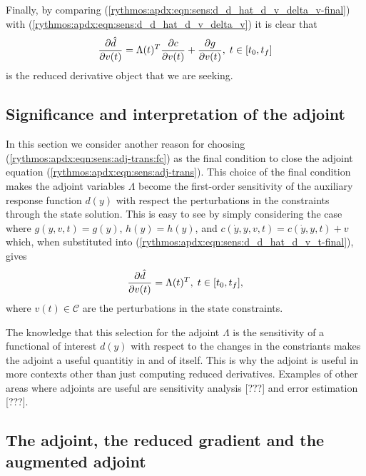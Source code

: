 \documentclass[pdf,ps2pdf,11pt]{SANDreport}
\begin{document}
Finally, by comparing (\ref{rythmos:apdx:eqn:sens:d_d_hat_d_v_delta_v-final})
with (\ref{rythmos:apdx:eqn:sens:d_d_hat_d_v_delta_v}) it is clear that
%
\begin{equation}
\displaystyle{\frac{\partial \hat{d}}{\partial v(t)}} = \Lambda(t)^T \displaystyle{\frac{\partial c}{\partial v(t)}} + \displaystyle{\frac{\partial g}{\partial v(t)}}, \; t\in[t_0,t_f]
\label{rythmos:apdx:eqn:sens:d_d_hat_d_v_t-final}
\end{equation}
%
is the reduced derivative object that we are seeking.

\subsection{Significance and interpretation of the adjoint}

In this section we consider another reason for choosing
(\ref{rythmos:apdx:eqn:sens:adj-trans:fc}) as the final condition to close the
adjoint equation (\ref{rythmos:apdx:eqn:sens:adj-trans}).  This choice of the
final condition makes the adjoint variables $\Lambda$ become the first-order
sensitivity of the auxiliary response function $d(y)$ with respect the
perturbations in the constraints through the state solution.  This is easy to
see by simply considering the case where $g(y,v,t) = g(y)$, $h(y) = h(y)$, and
$c(\dot{y},y,v,t) = c(\dot{y},y,t) + v$ which, when substituted into
(\ref{rythmos:apdx:eqn:sens:d_d_hat_d_v_t-final}), gives
%
\begin{equation}
\displaystyle{\frac{\partial \hat{d}}{\partial v(t)}} = \Lambda(t)^T , \; t\in[t_0,t_f],
\label{rythmos:apdx:eqn:sens:adjoint_interpretation}
\end{equation}
%
where $v(t)\in\mathcal{C}$ are the perturbations in the state constraints.

The knowledge that this selection for the adjoint $\Lambda$ is the sensitivity
of a functional of interest $d(y)$ with respect to the changes in the
constriants makes the adjoint a useful quantitiy in and of itself.  This is
why the adjoint is useful in more contexts other than just computing reduced
derivatives.  Examples of other areas where adjoints are useful are
sensitivity analysis [???] and error estimation [???].

\subsection{The adjoint, the reduced gradient and the augmented adjoint}
\end{document}
